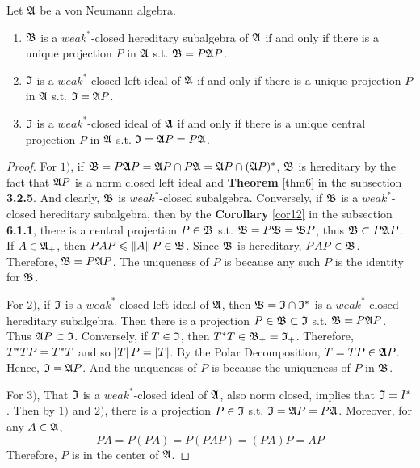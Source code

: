 \documentclass[a4paper,11pt]{report}
\begin{document}
\begin{thm}
	Let $\mathfrak{A}$ be a von Neumann algebra.
	\begin{enumerate}[label=\arabic*)]
		\item $\mathfrak{B}$ is a $weak^*$-closed hereditary subalgebra of $\mathfrak{A}$ if and only if there is a unique projection $P$ in $\mathfrak{A}$ s.t. $\mathfrak{B} = P \mathfrak{A} P$.
		\item $\mathfrak{I}$ is a $weak^*$-closed left ideal of $\mathfrak{A}$ if and only if there is a unique projection $P$ in $\mathfrak{A}$ s.t. $\mathfrak{I} = \mathfrak{A} P$.
		\item $\mathfrak{I}$ is a $weak^*$-closed ideal of $\mathfrak{A}$ if and only if there is a unique central projection $P$ in $\mathfrak{A}$ s.t. $\mathfrak{I} = \mathfrak{A} P = P \mathfrak{A}$.
	\end{enumerate}
\end{thm}
\begin{proof}
	For $1)$, if $\mathfrak{B} = P \mathfrak{A} P = \mathfrak{A} P \cap P \mathfrak{A} = \mathfrak{A} P \cap (\mathfrak{A} P)^{*}$, $\mathfrak{B}$ is hereditary by the fact that $\mathfrak{A} P$ is a norm closed left ideal and \textbf{Theorem} \ref{thm6} in the subsection \textbf{3.2.5}. And clearly, $\mathfrak{B}$ is $weak^*$-closed subalgebra. Conversely, if $\mathfrak{B}$ is a $weak^*$-closed hereditary subalgebra, then by the \textbf{Corollary} \ref{cor12} in the subsection \textbf{6.1.1}, there is a central projection $P \in \mathfrak{B}$ s.t. $\mathfrak{B} = P \mathfrak{B} = \mathfrak{B} P$, thus $\mathfrak{B} \subset P \mathfrak{A} P$. If $A \in \mathfrak{A}_+$, then $PAP  \leqslant \left\lVert A\right\lVert P \in \mathfrak{B}$. Since $\mathfrak{B}$ is hereditary, $PAP \in \mathfrak{B}$. Therefore, $\mathfrak{B} =  P \mathfrak{A} P$. The uniqueness of $P$ is because any such $P$ is the identity for $\mathfrak{B}$.
	\item For $2)$, if $\mathfrak{I}$ is a $weak^*$-closed left ideal of $\mathfrak{A}$, then $\mathfrak{B} = \mathfrak{I} \cap \mathfrak{I}^{*}$ is a $weak^*$-closed hereditary subalgebra. Then there is a projection $P \in \mathfrak{B} \subset \mathfrak{I}$ s.t. $\mathfrak{B} =  P \mathfrak{A} P$. Thus $\mathfrak{A} P \subset \mathfrak{I}$. Conversely, if $T \in \mathfrak{I}$, then $T^{*}T \in \mathfrak{B}_+ = \mathfrak{I}_+$. Therefore, $T^{*}T P = T^{*}T$ and so $\left\lvert T\right\lvert P = \left\lvert T\right\lvert$. By the Polar Decomposition, $T = TP \in \mathfrak{A} P$. Hence, $\mathfrak{I} = \mathfrak{A} P$. And the unqueness of $P$ is because the uniqueness of $P$ in $\mathfrak{B}$.
	\item For $3)$, That $\mathfrak{I}$ is a $weak^*$-closed ideal of $\mathfrak{A}$, also norm closed, implies that $\mathfrak{I} = I^{*}$. Then by $1)$ and $2)$, there is a projection $P \in \mathfrak{I}$ s.t. $\mathfrak{I} = \mathfrak{A} P = P \mathfrak{A}$. Moreover, for any $A \in \mathfrak{A}$,
	\begin{equation*}
		PA = P(PA) = P (PAP) = (PA) P = AP
	\end{equation*}
	Therefore, $P$ is in the center of $\mathfrak{A}$.
\end{proof}
\end{document}
